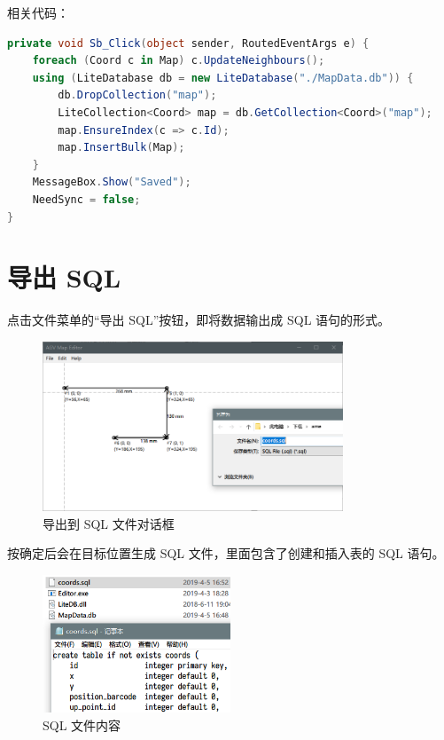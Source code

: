 相关代码：

\begin{lstlisting}[language=cs]
private void Sb_Click(object sender, RoutedEventArgs e) {
    foreach (Coord c in Map) c.UpdateNeighbours();
    using (LiteDatabase db = new LiteDatabase("./MapData.db")) {
        db.DropCollection("map");
        LiteCollection<Coord> map = db.GetCollection<Coord>("map");
        map.EnsureIndex(c => c.Id);
        map.InsertBulk(Map);
    }
    MessageBox.Show("Saved");
    NeedSync = false;
}
\end{lstlisting}

\section{导出 SQL}

点击文件菜单的``导出 SQL''按钮，即将数据输出成 SQL 语句的形式。

\begin{figure}[H]
  \centering
  \includegraphics[width=0.8\textwidth]{assets/export.png}
  \caption{导出到 SQL 文件对话框}
  \label{fig:export}
\end{figure}

按确定后会在目标位置生成 SQL 文件，里面包含了创建和插入表的 SQL 语句。

\begin{figure}[H]
  \centering
  \includegraphics[width=0.5\textwidth]{assets/sql.png}
  \caption{SQL 文件内容}
  \label{fig:sql}
\end{figure}

